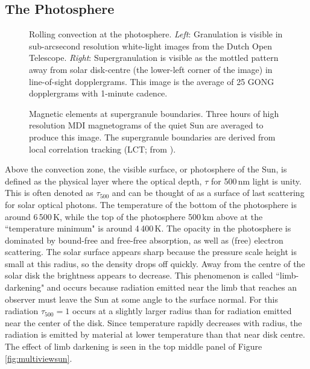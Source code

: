 \subsection{The Photosphere}\label{intro:photosphere}

\begin{figure}[!t]
\caption[Rolling convection at the photosphere.]{Rolling convection at the photosphere. \emph{Left}: Granulation is visible in sub-arcsecond resolution white-light images from the Dutch Open Telescope. \emph{Right}: Supergranulation is visible as the mottled pattern away from solar disk-centre (the lower-left corner of the image) in line-of-sight dopplergrams. This image is the average of 25 GONG dopplergrams with 1-minute cadence.} %
\label{fig:granulation}
\end{figure}

\begin{figure}[!t]
\caption[Magnetic elements at supergranule boundaries.]{Magnetic elements at supergranule boundaries. Three hours of high resolution MDI magnetograms of the quiet Sun are averaged to produce this image. The supergranule boundaries are derived from local correlation tracking (LCT; from \citealp{Schrijver:1997b}).}
\label{fig:maggranboundary}
\end{figure}

Above the convection zone, the visible surface, or photosphere of the Sun, is defined as the physical layer where the optical depth, $\tau$ for 500\,nm light is unity. This is often denoted as $\tau_{500}$ and can be thought of as a surface of last scattering for solar optical photons. The temperature of the bottom of the photosphere is around 6\,500\,K, while the top of the photosphere 500\,km above at the ``temperature minimum" is around 4\,400\,K. The opacity in the photosphere is dominated by bound-free and free-free absorption, as well as (free) electron scattering. The solar surface appears sharp because the pressure scale height is small at this radius, so the density drops off quickly. Away from the centre of the solar disk the brightness appears to decrease. This phenomenon is called ``limb-darkening" and occurs because radiation emitted near the limb that reaches an observer must leave the Sun at some angle to the surface normal. For this radiation $\tau_{500}=1$ occurs at a slightly larger radius than for radiation emitted near the center of the disk. Since temperature rapidly decreases with radius, the radiation is emitted by material at lower temperature than that near disk centre. The effect of limb darkening is seen in the top middle panel of Figure\,\ref{fig:multiviewsun}. 

